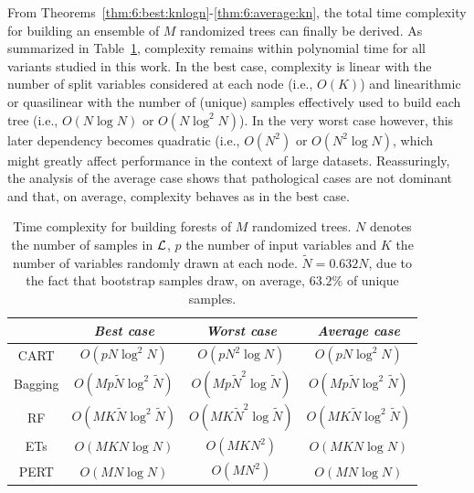 From Theorems~\ref{thm:6:best:knlogn}-\ref{thm:6:average:kn}, the total time
complexity for building an ensemble of $M$ randomized trees can finally be
derived. As summarized in Table~\ref{table:complexity-fit}, complexity remains
within polynomial time for all variants studied in this work. In the best
case, complexity is linear with the number of split variables considered at
each node (i.e., $O(K)$) and linearithmic or quasilinear with the number of
(unique) samples effectively used to build each tree (i.e., $O(N\log N)$ or
$O(N\log^2 N)$). In the very worst case however, this later dependency becomes quadratic
(i.e., $O(N^2)$ or $O(N^2 \log N)$, which might greatly affect performance in
the context of large datasets. Reassuringly, the analysis of the average case
shows that pathological cases are not dominant and that, on average, complexity
behaves as in the best case.

\begin{table}[b]
    \centering
    \begin{tabular}{| c | c c c |}
    \hline
         & \textit{Best case} & \textit{Worst case} & \textit{Average case}  \\
    \hline
    \hline
    CART & $O(pN\log^2 N)$ & $O(pN^2\log N)$ & $O(pN\log^2 N)$ \\
    Bagging & $O(Mp\widetilde{N}\log^2 \widetilde{N})$ & $O(Mp\widetilde{N}^2\log \widetilde{N})$ & $O(Mp\widetilde{N}\log^2 \widetilde{N})$  \\
    RF & $O(MK\widetilde{N}\log^2 \widetilde{N})$ & $O(MK\widetilde{N}^2\log \widetilde{N})$ & $O(MK\widetilde{N}\log^2 \widetilde{N})$  \\
    ETs & $O(MKN\log N)$ & $O(MKN^2)$ & $O(MKN\log N)$  \\
    PERT & $O(MN\log N)$ & $O(MN^2)$ & $O(MN\log N)$  \\
    \hline
    \end{tabular}
    \caption{Time complexity for building forests of $M$ randomized trees. $N$ denotes the number of samples in ${\cal L}$, $p$ the number of input variables and $K$ the number of variables randomly drawn at each node. $\widetilde{N} = 0.632 N$, due to the fact that bootstrap samples draw, on average, $63.2\%$ of unique samples.}
    \label{table:complexity-fit}
\end{table}

